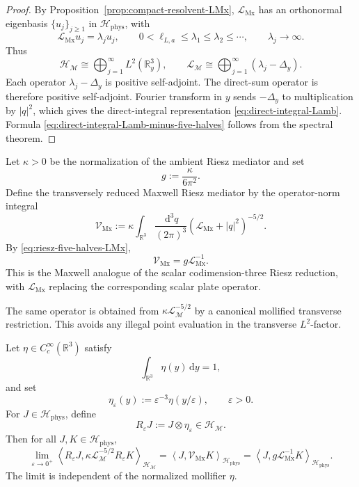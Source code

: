 \documentclass[11pt]{article}
\providecommand{\R}{\mathbb{R}}
\providecommand{\dd}{\,\mathrm{d}}
\providecommand{\eps}{\varepsilon}
\providecommand{\abs}[1]{\left\lvert #1\right\rvert}
\providecommand{\inner}[2]{\left\langle #1,#2\right\rangle}
\providecommand{\Hphys}{\mathcal H_{\mathrm{phys}}}
\providecommand{\LMx}{\mathcal L_{\mathrm{Mx}}}
\providecommand{\Lamb}{\mathcal L_{\mathcal M}}
\providecommand{\VMx}{\mathcal V_{\mathrm{Mx}}}
\numberwithin{equation}{section}
\begin{document}
\begin{proof}
By Proposition~\ref{prop:compact-resolvent-LMx}, \(\LMx\) has an orthonormal
eigenbasis \(\{u_j\}_{j\geq1}\) in \(\Hphys\), with
\[
    \LMx u_j=\lambda_j u_j,
    \qquad
    0<\ell_{L,a}\leq \lambda_1\leq\lambda_2\leq\cdots,
    \qquad
    \lambda_j\to\infty .
\]
Thus
\[
    \mathcal H_{\mathcal M}
    \cong
    \bigoplus_{j=1}^{\infty}L^2(\R^3_y),
    \qquad
    \Lamb
    \cong
    \bigoplus_{j=1}^{\infty}(\lambda_j-\Delta_y).
\]
Each operator \(\lambda_j-\Delta_y\) is positive self-adjoint.  The direct-sum
operator is therefore positive self-adjoint.  Fourier transform in \(y\) sends
\(-\Delta_y\) to multiplication by \(\abs{q}^2\), which gives the direct-integral
representation \eqref{eq:direct-integral-Lamb}.  Formula
\eqref{eq:direct-integral-Lamb-minus-five-halves} follows from the spectral
theorem.
\end{proof}

Let \(\kappa>0\) be the normalization of the ambient Riesz mediator and set
\begin{equation}
    g:=\frac{\kappa}{6\pi^2} .
    \label{eq:g-def-section04}
\end{equation}
Define the transversely reduced Maxwell Riesz mediator by the operator-norm
integral
\begin{equation}
    \VMx
    :=
    \kappa
    \int_{\R^3}\frac{\dd^3 q}{(2\pi)^3}
    (\LMx+\abs{q}^2)^{-5/2} .
    \label{eq:VMx-def-section04}
\end{equation}
By \eqref{eq:riesz-five-halves-LMx},
\begin{equation}
    \boxed{\VMx=g\LMx^{-1}.}
    \label{eq:VMx-equals-gLMxinv-section04}
\end{equation}
This is the Maxwell analogue of the scalar codimension-three Riesz reduction,
with \(\LMx\) replacing the corresponding scalar plate operator.

The same operator is obtained from \(\kappa\Lamb^{-5/2}\) by a canonical
mollified transverse restriction.  This avoids any illegal point evaluation in
the transverse \(L^2\)-factor.

\begin{proposition}
\label{prop:mollified-brane-restriction-Mx}
Let \(\eta\in C_c^\infty(\R^3)\) satisfy
\[
    \int_{\R^3}\eta(y)\dd y=1,
\]
and set
\[
    \eta_\eps(y):=\eps^{-3}\eta(y/\eps),
    \qquad \eps>0 .
\]
For \(J\in\Hphys\), define
\[
    R_\eps J:=J\otimes \eta_\eps
    \in\mathcal H_{\mathcal M} .
\]
Then for all \(J,K\in\Hphys\),
\begin{equation}
    \lim_{\eps\to0^+}
    \inner{R_\eps J}{\kappa\Lamb^{-5/2}R_\eps K}_{\mathcal H_{\mathcal M}}
    =
    \inner{J}{\VMx K}_{\Hphys}
    =
    \inner{J}{g\LMx^{-1}K}_{\Hphys} .
    \label{eq:mollified-brane-restriction-limit}
\end{equation}
The limit is independent of the normalized mollifier \(\eta\).
\end{proposition}
\end{document}
